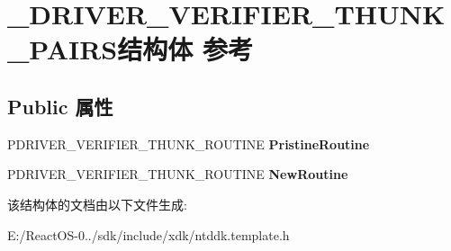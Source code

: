 \hypertarget{struct___d_r_i_v_e_r___v_e_r_i_f_i_e_r___t_h_u_n_k___p_a_i_r_s}{}\section{\+\_\+\+D\+R\+I\+V\+E\+R\+\_\+\+V\+E\+R\+I\+F\+I\+E\+R\+\_\+\+T\+H\+U\+N\+K\+\_\+\+P\+A\+I\+R\+S结构体 参考}
\label{struct___d_r_i_v_e_r___v_e_r_i_f_i_e_r___t_h_u_n_k___p_a_i_r_s}
\subsection*{Public 属性}
\begin{DoxyCompactItemize}
\item 
\mbox{\label{struct___d_r_i_v_e_r___v_e_r_i_f_i_e_r___t_h_u_n_k___p_a_i_r_s_ae3cf1d7da8e903aa25a067691b1615bb}} 
P\+D\+R\+I\+V\+E\+R\+\_\+\+V\+E\+R\+I\+F\+I\+E\+R\+\_\+\+T\+H\+U\+N\+K\+\_\+\+R\+O\+U\+T\+I\+NE {\bfseries Pristine\+Routine}
\item 
\mbox{\label{struct___d_r_i_v_e_r___v_e_r_i_f_i_e_r___t_h_u_n_k___p_a_i_r_s_a531fb80cd1ee8db3e1224e3c3218bfd1}} 
P\+D\+R\+I\+V\+E\+R\+\_\+\+V\+E\+R\+I\+F\+I\+E\+R\+\_\+\+T\+H\+U\+N\+K\+\_\+\+R\+O\+U\+T\+I\+NE {\bfseries New\+Routine}
\end{DoxyCompactItemize}


该结构体的文档由以下文件生成\+:\begin{DoxyCompactItemize}
\item 
E\+:/\+React\+O\+S-\/0../sdk/include/xdk/ntddk.\+template.\+h\end{DoxyCompactItemize}
